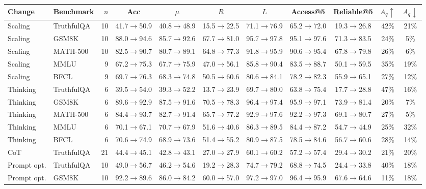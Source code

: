 \begin{tabular}{llr|cccccc|cc}
\toprule
Change & Benchmark & $n$ & Acc & $\mu$ & $R$ & $L$ & Access@5 & Reliable@5 & $A_q\uparrow$ & $A_q\downarrow$ \\
\midrule
Scaling & TruthfulQA & 10 & 41.7$\to$50.9 & 40.8$\to$48.9 & 15.5$\to$22.5 & 71.1$\to$76.9 & 65.2$\to$72.0 & 19.3$\to$26.8 & 42\% & 21\% \\
Scaling & GSM8K & 10 & 88.0$\to$94.6 & 85.7$\to$92.6 & 67.7$\to$81.0 & 95.7$\to$97.8 & 95.1$\to$97.6 & 71.3$\to$83.5 & 24\% & 5\% \\
Scaling & MATH-500 & 10 & 82.5$\to$90.7 & 80.7$\to$89.1 & 64.8$\to$77.3 & 91.8$\to$95.9 & 90.6$\to$95.4 & 67.8$\to$79.8 & 26\% & 6\% \\
Scaling & MMLU & 9 & 67.2$\to$75.3 & 67.7$\to$75.9 & 47.0$\to$56.1 & 85.8$\to$90.4 & 83.5$\to$88.7 & 50.1$\to$59.5 & 35\% & 19\% \\
Scaling & BFCL & 9 & 69.7$\to$76.3 & 68.3$\to$74.8 & 50.5$\to$60.6 & 80.6$\to$84.1 & 78.2$\to$82.3 & 55.9$\to$65.1 & 27\% & 12\% \\
Thinking & TruthfulQA & 6 & 39.5$\to$54.0 & 39.3$\to$52.2 & 13.7$\to$23.9 & 69.7$\to$80.0 & 63.8$\to$75.4 & 17.7$\to$28.8 & 47\% & 16\% \\
Thinking & GSM8K & 6 & 89.6$\to$92.9 & 87.5$\to$91.6 & 70.5$\to$78.3 & 96.4$\to$97.4 & 95.9$\to$97.1 & 73.9$\to$81.4 & 20\% & 7\% \\
Thinking & MATH-500 & 6 & 84.4$\to$93.7 & 82.7$\to$91.4 & 65.7$\to$77.2 & 92.9$\to$97.6 & 92.2$\to$97.3 & 69.1$\to$80.7 & 27\% & 5\% \\
Thinking & MMLU & 6 & 70.1$\to$67.1 & 70.7$\to$67.9 & 51.6$\to$40.6 & 86.3$\to$89.5 & 84.4$\to$87.2 & 54.7$\to$44.9 & 25\% & 32\% \\
Thinking & BFCL & 6 & 70.6$\to$74.9 & 68.9$\to$73.6 & 51.4$\to$55.2 & 80.9$\to$87.5 & 78.5$\to$84.6 & 56.7$\to$60.6 & 28\% & 14\% \\
CoT & TruthfulQA & 21 & 44.4$\to$45.1 & 42.8$\to$43.1 & 27.0$\to$27.9 & 60.1$\to$60.2 & 57.2$\to$57.4 & 29.4$\to$30.2 & 21\% & 20\% \\
Prompt opt. & TruthfulQA & 10 & 49.0$\to$56.7 & 46.2$\to$54.6 & 19.2$\to$28.3 & 74.7$\to$79.2 & 68.8$\to$74.5 & 24.4$\to$33.8 & 40\% & 18\% \\
Prompt opt. & GSM8K & 10 & 92.2$\to$89.6 & 86.0$\to$84.2 & 60.0$\to$57.0 & 97.2$\to$97.0 & 96.4$\to$95.9 & 67.6$\to$64.6 & 11\% & 18\% \\
\bottomrule
\end{tabular}
